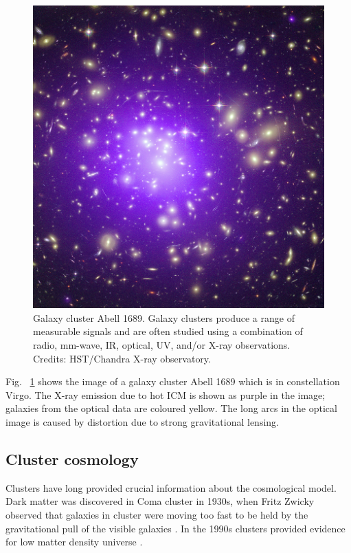 \begin{figure}[H]
\includegraphics[width = \columnwidth]{figs/Abell_1689.jpg}
\caption{Galaxy cluster Abell 1689. Galaxy clusters produce a range of measurable signals and are often studied using a combination of radio, mm-wave, IR, optical, UV, and/or X-ray observations.%
 Credits: HST/Chandra X-ray observatory. }
\label{cluster}
\end{figure}

Fig. ~\ref{cluster} shows the image of a galaxy cluster Abell 1689 which is in constellation Virgo. The X-ray emission due to hot ICM is shown as purple in the image; galaxies from the optical data are coloured yellow. The long arcs in the optical image is caused by distortion due to strong gravitational lensing. \\

\subsection{Cluster cosmology}
Clusters have long provided crucial information about the cosmological model. Dark matter was discovered in Coma cluster in 1930s, when Fritz Zwicky observed that galaxies in cluster were moving too fast to be held by the gravitational pull of the visible galaxies \citep{zwicky33}. 
In the 1990s clusters provided evidence for low matter density universe \citep{white93a}. 

